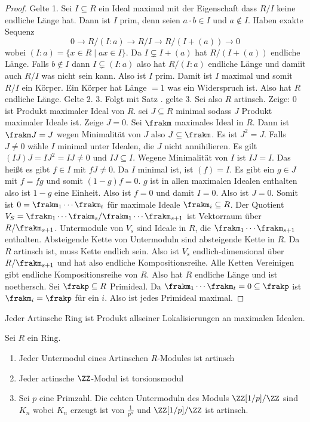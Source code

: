 \begin{proof}
	Gelte 1. Sei \(I\subseteq R\) ein Ideal maximal mit der Eigenschaft dass \(R/I\) keine endliche Länge hat. Dann ist \(I\) prim, denn seien \(a\cdot b\in I\) und \(a\not\in I\). Haben exakte Sequenz
	\[0\to R/(I:a)\to R/I\to R/(I+(a))\to 0\] wobei \((I:a)=\{x\in R\mid ax\in I\}\). Da \(I\subsetneq I+(a)\) hat \(R/(I+(a))\) endliche Länge. Falls \(b\not\in I\) dann \(I\subsetneq (I:a)\) also hat \(R/(I:a)\) endliche Länge und damiit auch \(R/I\) was nicht sein kann. Also ist \(I\) prim. Damit ist \(I\) maximal und somit \(R/I\) ein Körper. Ein Körper hat Länge \(=1\) was ein Widerspruch ist.
	Also hat \(R\) endliche Länge.
	Gelte 2. 3. Folgt mit Satz . gelte 3. Sei also \(R\) artinsch. Zeige: \(0\) ist Produkt maximaler Ideal von \(R\).
	sei \(J\subseteq R\) minimal sodass \(J\) Produkt maximaler Ideale ist. Zeige \(J=0\).
	Sei \(\frakm \) maximales Ideal in \(R\). Dann ist \(\frakm J=J\) wegen Minimalität von \(J\) also \(J\subseteq \frakm\). Es ist \(J^2=J\).
	Falls \(J\neq 0\) wähle \(I\) minimal unter Idealen, die \(J\) nicht annihilieren.
	Es gilt \((IJ)J=IJ^2=IJ\neq 0\) und \(IJ\subseteq I\). Wegene Minimalität von \(I\) ist \(IJ=I\). Das heißt es gibt \(f\in I\) mit \(fJ\neq 0\). Da \(I\) minimal ist, ist \((f)=I\). Es gibt ein \(g\in J\) mit \(f=fg\) und somit \((1-g)f=0\).
	\(g\) ist in allen maximalen Idealen enthalten also ist \(1-g\) eine Einheit. Also ist \(f=0\) und damit \(I=0\). Also ist \(J=0\).
	Somit ist \(0=\frakm_1\cdots \frakm_t\) für maximale Ideale \(\frakm_i\subseteq R\).
	Der Quotient \(V_S=\frakm_1\cdots \frakm_s/\frakm_1\cdots \frakm_{s+1}\) ist Vektorraum über \(R/\frakm_{s+1}\). Untermodule von \(V_s\) sind Ideale in \(R\), die \(\frakm_1\cdots \frakm_{s+1}\) enthalten.
	Absteigende Kette von Untermoduln sind absteigende Kette in \(R\). Da \(R\) artinsch ist, muss Kette endlich sein.
	Also ist \(V_s\) endlich-dimensional über \(R/\frakm_{s+1}\) und hat also endliche Kompositionsreihe. Alle Ketten Vereinigen gibt endliche Kompositionsreihe von \(R\). Also hat \(R\) endliche Länge und ist noethersch. Sei \(\frakp\subseteq R\) Primideal. Da \(\frakm_1\cdots \frakm_t=0\subseteq \frakp\) ist \(\frakm_i=\frakp\) für ein \(i\). Also ist jedes Primideal maximal.
\end{proof}
\begin{Kor}\label{Kor:StruktArtinring}
	Jeder Artinsche Ring ist Produkt allseiner Lokalisierungen an maximalen Idealen.
\end{Kor}
\begin{Lemma}
	Sei \(R\) ein Ring.
	\begin{enumerate}
		\item Jeder Untermodul eines Artinschen \(R\)-Modules ist artinsch
		\item Jeder artinsche \(\ZZ\)-Modul ist torsionsmodul
		\item Sei \(p\) eine Primzahl. Die echten Untermoduln des Moduls \(\ZZ[1/p]/\ZZ\) sind \(K_n\) wobei \(K_n\) erzeugt ist von \(\frac{1}{p^n}\) und \(\ZZ[1/p]/\ZZ\) ist artinsch.
	\end{enumerate}
\end{Lemma}
